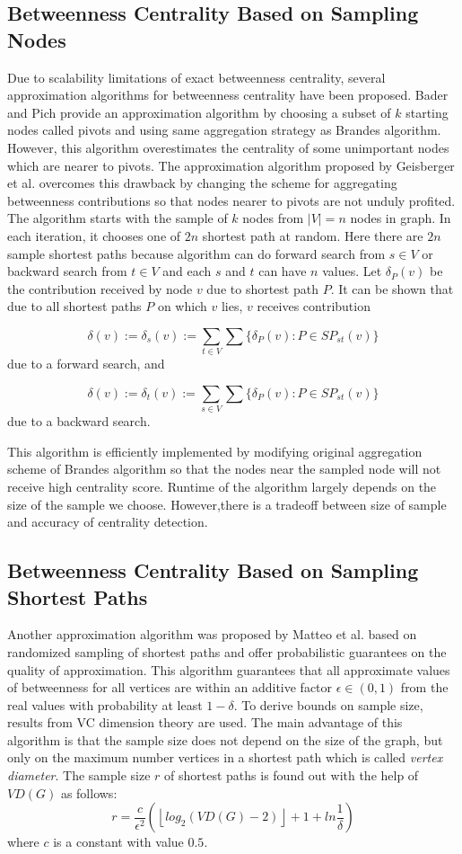 \documentclass[runningheads,a4paper]{llncs}
\begin{document}
\subsection*{Betweenness Centrality Based on Sampling Nodes}
Due to scalability limitations of exact betweenness centrality, several approximation algorithms for betweenness centrality have been proposed. Bader and Pich\cite{bp} provide an approximation algorithm by choosing a subset of $k$ starting nodes called pivots and using same aggregation strategy as Brandes algorithm. However, this algorithm overestimates the centrality of some unimportant nodes which are nearer to pivots. The approximation algorithm proposed by Geisberger et al. \cite{sanders} overcomes this drawback by changing the scheme for aggregating betweenness contributions so that nodes nearer to pivots are not unduly profited. The algorithm starts with the sample of $k$ nodes from $|V| = n$ nodes in graph. In each iteration, it chooses one of $2n$ shortest path at random. Here there are $2n$ sample shortest paths because algorithm can do forward search from $s \in V$ or backward search from $t \in V$ and each $s$ and $t$ can have $n$ values. Let $\delta_{P}(v)$ be the contribution received by node $v$ due to shortest path $P$. It can be shown that \cite{sanders} due to all shortest paths $P$ on which $v$ lies, $v$ receives contribution 

$$\delta(v) := \delta_{s}(v) := \sum_{t \in V}\sum \{\delta_{P}(v):  P \in SP_{st}(v)\}$$
due to a forward search, and 

$$\delta(v) := \delta_{t}(v) := \sum_{s \in V}\sum \{\delta_{P}(v):  P \in SP_{st}(v)\}$$
due to a backward search. 

This algorithm is efficiently implemented by modifying original aggregation scheme of Brandes algorithm so that the nodes near the sampled node will not receive high centrality score. Runtime of the algorithm largely depends on the size of the sample we choose. However,there is a tradeoff between size of sample and accuracy of centrality detection.  


\subsection*{Betweenness Centrality Based on Sampling Shortest Paths}
Another approximation algorithm was proposed by Matteo et al. \cite{matteo} based on randomized sampling of shortest paths and offer probabilistic guarantees on the quality of approximation. This algorithm guarantees that all approximate values of betweenness for all vertices are within an additive factor $\epsilon \in (0,1)$ from the real values with probability at least $1-\delta$. To derive bounds on sample size, results from VC dimension theory\cite{vc} are used. The main advantage of this algorithm is that the sample size does not depend on the size of the graph, but only on the maximum number vertices in a shortest path which is called \textit{vertex diameter}. The sample size $r$ of shortest paths is found out with the help of $VD(G)$ as follows:
$$
r = \frac{c}{\epsilon^{2}}(\left\lfloor{log_{2}(VD(G) - 2)}\right\rfloor + 1 + ln\frac{1}{\delta})
$$ 
where $c$ is a constant with value $0.5$. 
\end{document}
